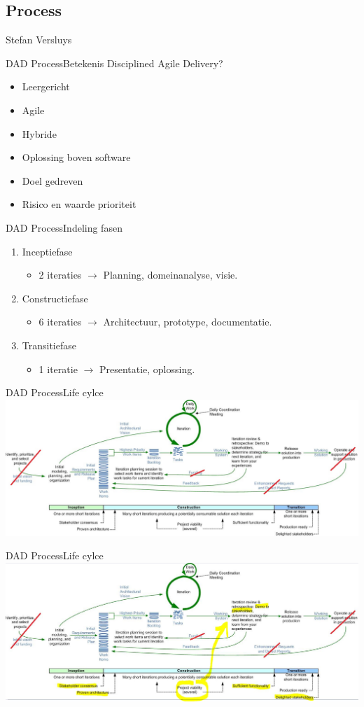 \begin{frame}
    \section{Process}
    Stefan Versluys
\end{frame}

\begin{frame}[label=process1]{DAD Process}{Betekenis}
	Disciplined Agile Delivery?
	\begin{itemize}[<+->]
	 	\item Leergericht
		\item Agile
		\item Hybride
		\item Oplossing boven software
		\item Doel gedreven
		\item Risico en waarde prioriteit
	\end{itemize}
\end{frame}

\begin{frame}[fragile]{DAD Process}{Indeling fasen}
	\begin{enumerate}
	\item<1-> Inceptiefase
		\begin{itemize}
		\item 2 iteraties
			$\rightarrow$ Planning, domeinanalyse, visie.
		\end{itemize}
	\item<2-> Constructiefase
		\begin{itemize}
		\item 6 iteraties
			$\rightarrow$ Architectuur, prototype, documentatie.
		\end{itemize}
	\item<3-> Transitiefase
		\begin{itemize}
		\item 1 iteratie
			$\rightarrow$ Presentatie, oplossing.
		\end{itemize}		
	\end{enumerate}  
\end{frame}


\begin{frame}[label=process2]{DAD Process}{Life cylce}
    \includegraphics[width = .9\textwidth]{dadLifecycleUP2}
\end{frame}

\begin{frame}[label=process2]{DAD Process}{Life cylce}
    \includegraphics[width = .9\textwidth]{dadLifecycleUP2s}
\end{frame}
